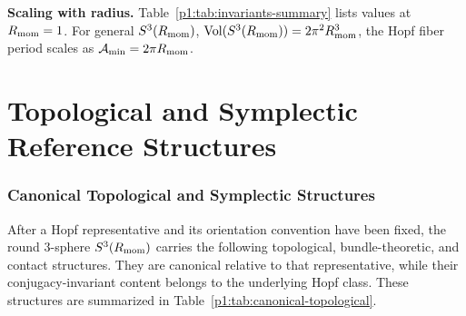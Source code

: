 \documentclass[11pt]{article}
\begin{document}
\begin{table}[htbp]
\centering
\begingroup
\small
\setlength{\tabcolsep}{4pt}
\renewcommand{\arraystretch}{1.25}
\caption[Fundamental Hopf-fibered invariants]{Fundamental Hopf-fibered invariants.}
\label{p1:tab:invariants-summary}
\endgroup
\end{table}
\noindent\textbf{Scaling with radius.} 
Table~\ref{p1:tab:invariants-summary} lists values at $R_{\mathrm{mom}}=1$. For general $S^3(R_{\mathrm{mom}})$, $\mathrm{Vol}(S^3(R_{\mathrm{mom}}))=2\pi^2R_{\mathrm{mom}}^3$, the Hopf fiber period scales as \(\mathcal A_{\min}=2\pi R_{\mathrm{mom}}\).


\part{Topological and Symplectic Reference Structures}
\label{p1:part:topological-symplectic}

\section{Canonical Topological and Symplectic Structures}
\label{p1:sec:canonical-topological}
After a Hopf representative and its orientation convention have been fixed, the
round \(3\)-sphere \(S^3(R_{\mathrm{mom}})\) carries the following topological,
bundle-theoretic, and contact structures.  They are canonical relative to that
representative, while their conjugacy-invariant content belongs to the
underlying Hopf class.  These structures are summarized in
Table~\ref{p1:tab:canonical-topological}.
\end{document}

